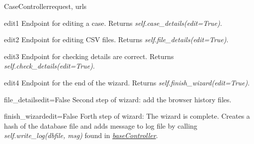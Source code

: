 \documentclass[letterpaper,10pt,english]{manual}
\begin{document}
\begin{classdesc}{CaseController}{request, urls}
\hypertarget{webscavator.controllers.caseController.CaseController.edit1}{}\begin{methoddesc}{edit1}{}
Endpoint for editing a case. Returns \emph{self.case\_details(edit=True)}.
\end{methoddesc}

\hypertarget{webscavator.controllers.caseController.CaseController.edit2}{}\begin{methoddesc}{edit2}{}
Endpoint for editing CSV files. Returns \emph{self.file\_details(edit=True)}.
\end{methoddesc}

\hypertarget{webscavator.controllers.caseController.CaseController.edit3}{}\begin{methoddesc}{edit3}{}
Endpoint for checking details are correct. Returns \emph{self.check\_details(edit=True)}.
\end{methoddesc}

\hypertarget{webscavator.controllers.caseController.CaseController.edit4}{}\begin{methoddesc}{edit4}{}
Endpoint for the end of the wizard. Returns \emph{self.finish\_wizard(edit=True)}.
\end{methoddesc}

\hypertarget{webscavator.controllers.caseController.CaseController.file_details}{}\begin{methoddesc}{file\_details}{edit=False}
Second step of wizard: add the browser history files.
\end{methoddesc}

\hypertarget{webscavator.controllers.caseController.CaseController.finish_wizard}{}\begin{methoddesc}{finish\_wizard}{edit=False}
Forth step of wizard: The wizard is complete. Creates a hash of the database
file and adds message to log file by calling \emph{self.write\_log(dbfile, msg)}
found in \hyperlink{--doc-baseController}{\emph{baseController}}.
\end{methoddesc}


\end{classdesc}
\end{document}
